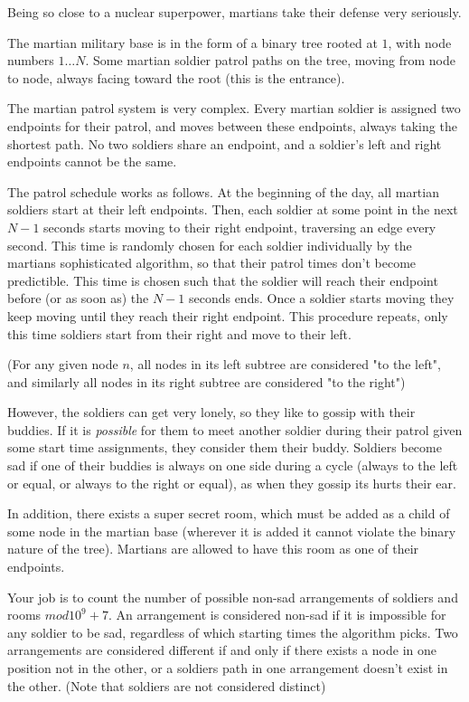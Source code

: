 
Being so close to a nuclear superpower, martians take their defense very seriously.

The martian military base is in the form of a binary tree rooted at $1$, with node numbers $1 \dots N$. Some martian soldier patrol paths on the tree, moving from node to node, always facing toward the root (this is the entrance). 

The martian patrol system is very complex. Every martian soldier is assigned two endpoints for their patrol, and moves between these endpoints, always taking the shortest path. No two soldiers share an endpoint, and a soldier's left and right endpoints cannot be the same.

The patrol schedule works as follows. At the beginning of the day, all martian soldiers start at their left endpoints. Then, each soldier at some point in the next $N-1$ seconds starts moving to their right endpoint, traversing an edge every second. This time is randomly chosen for each soldier individually by the martians sophisticated algorithm, so that their patrol times don't become predictible. This time is chosen such that the soldier will reach their endpoint before (or as soon as) the $N-1$ seconds ends. Once a soldier starts moving they keep moving until they reach their right endpoint. This procedure repeats, only this time soldiers start from their right and move to their left.

(For any given node $n$, all nodes in its left subtree are considered "to the left", and similarly all nodes in its right subtree are considered "to the right")

However, the soldiers can get very lonely, so they like to gossip with their buddies. If it is \emph{possible} for them to meet another soldier during their patrol given some start time assignments, they consider them their buddy. Soldiers become sad if one of their buddies is always on one side during a cycle (always to the left or equal, or always to the right or equal), as when they gossip its hurts their ear. 

In addition, there exists a super secret room, which must be added as a child of some node in the martian base (wherever it is added it cannot violate the binary nature of the tree). Martians are allowed to have this room as one of their endpoints.

Your job is to count the number of possible non-sad arrangements of soldiers and rooms $mod 10^9 + 7$. An arrangement is considered non-sad if it is impossible for any soldier to be sad, regardless of which starting times the algorithm picks. Two arrangements are considered different if and only if there exists a node in one position not in the other, or a soldiers path in one arrangement doesn't exist in the other. (Note that soldiers are not considered distinct)

